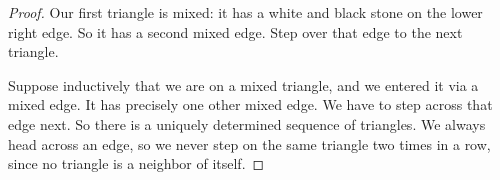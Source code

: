 \begin{proof}
Our first triangle is mixed: it has a white and black stone on the lower right edge.
So it has a second mixed edge.
Step over that edge to the next triangle.

Suppose inductively that we are on a mixed triangle, and we entered it via a mixed edge.
It has precisely one other mixed edge.
We have to step across that edge next.
So there is a uniquely determined sequence of triangles.
We always head across an edge, so we never step on the same triangle two times in a row, since no triangle is a neighbor of itself.



\end{proof}
